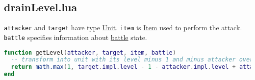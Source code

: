 \subsection{drainLevel.lua}
\texttt{attacker} and \texttt{target} have type \hyperref[Unit]{Unit}. \texttt{item} is \hyperref[Item]{Item} used to perform the attack. \texttt{battle} specifies information about \hyperref[Battle]{battle} state.
\begin{center}
\begin{lstlisting}[language=Lua]
function getLevel(attacker, target, item, battle)
  -- transform into unit with its level minus 1 and minus attacker over-level
  return math.max(1, target.impl.level - 1 - attacker.impl.level + attacker.baseImpl.level);
end
\end{lstlisting}
\end{center}
